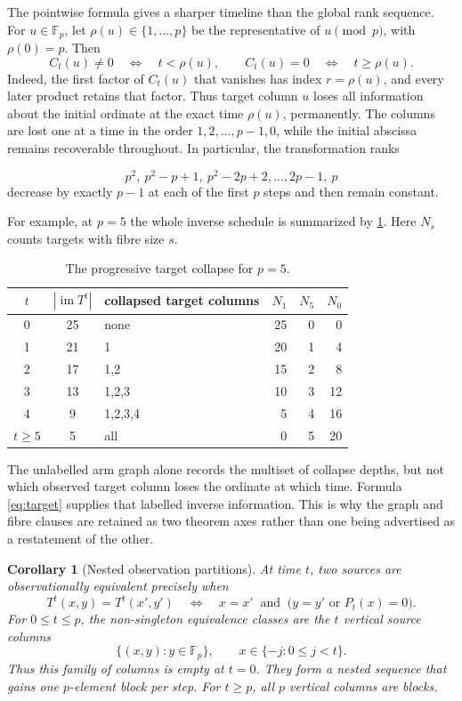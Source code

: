 \documentclass[10pt,a4paper]{amsart}
\newtheorem{corollary}[theorem]{Corollary}
\theoremstyle{remark}
\newcommand{\F}{\mathbb F}
\newcommand{\im}{\operatorname{im}}
\begin{document}
The pointwise formula gives a sharper timeline than the global rank sequence.
For \(u\in\F_p\), let \(\rho(u)\in\{1,\ldots,p\}\) be the representative of
\(u\pmod p\), with \(\rho(0)=p\).  Then
\[
C_t(u)\neq0\quad\Longleftrightarrow\quad t<\rho(u),
\qquad
C_t(u)=0\quad\Longleftrightarrow\quad t\geq\rho(u).                  \tag{8}
\]
Indeed, the first factor of \(C_t(u)\) that vanishes has index
\(r=\rho(u)\), and every later product retains that factor.  Thus target
column \(u\) loses all information about the initial ordinate at the exact
time \(\rho(u)\), permanently.  The columns are lost one at a time in the
order \(1,2,\ldots,p-1,0\), while the initial abscissa remains recoverable
throughout.  In particular, the transformation ranks

\[
p^2,\ p^2-p+1,\ p^2-2p+2,\ldots,2p-1,\ p
\]
decrease by exactly \(p-1\) at each of the first \(p\) steps and then remain
constant.

For example, at \(p=5\) the whole inverse schedule is summarized by
\cref{tab:p5}.  Here \(N_s\) counts targets with fibre size \(s\).

\begin{table}[h]
\centering
\caption{The progressive target collapse for \(p=5\).}
\label{tab:p5}
\small
\begin{tabular}{cclrrr}
\toprule
\(t\)&\(|\im T^t|\)&collapsed target columns&\(N_1\)&\(N_5\)&\(N_0\)\\
\midrule
0&25&none&25&0&0\\
1&21&1&20&1&4\\
2&17&1,2&15&2&8\\
3&13&1,2,3&10&3&12\\
4& 9&1,2,3,4&5&4&16\\
\(t\geq5\)&5&all&0&5&20\\
\bottomrule
\end{tabular}
\end{table}

The unlabelled arm graph alone records the multiset of collapse depths, but
not which observed target column loses the ordinate at which time.  Formula
\eqref{eq:target} supplies that labelled inverse information.  This is why the
graph and fibre clauses are retained as two theorem axes rather than one
being advertised as a restatement of the other.

\begin{corollary}[Nested observation partitions]\label{cor:partition}
At time \(t\), two sources are observationally equivalent precisely when
\[
T^t(x,y)=T^t(x',y')
\quad\Longleftrightarrow\quad
x=x'\ \text{ and }\ \bigl(y=y'\text{ or }P_t(x)=0\bigr).             \tag{9}
\]
For \(0\leq t\leq p\), the non-singleton equivalence classes are the \(t\)
vertical source columns
\[
\{(x,y):y\in\F_p\},\qquad
x\in\{-j:0\leq j<t\}.
\]
Thus this family of columns is empty at \(t=0\).
They form a nested sequence that gains one \(p\)-element block per step.
For \(t\geq p\), all \(p\) vertical columns are blocks.
\end{corollary}
\end{document}
